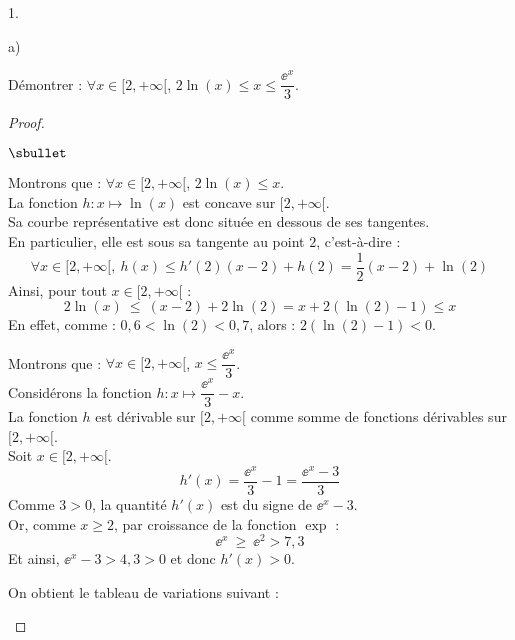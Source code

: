 \documentclass[11pt]{article}%
\begin{document}
\begin{noliste}{1.}
\item 
  \begin{noliste}{a)}
  \item Démontrer : $\forall x\in[2,+\infty[$, $2\ln(x)\leq x \leq
    \dfrac{\ee^x}{3}$.
    
    \begin{proof}~
      \begin{noliste}{$\sbullet$}
      \item Montrons que : $\forall x \in[2,+\infty[$, $2\ln(x)\leq x$.\\
        La fonction $h:x\mapsto \ln(x)$ est concave sur
        $[2,+\infty[$.\\
        Sa courbe représentative est donc située en dessous de ses
        tangentes.\\
        En particulier, elle est sous sa tangente au point $2$,
        c'est-à-dire :
        \[
        \forall x \in [2,+\infty[, \ h(x) \leq h'(2)(x-2) + h(2) =
        \dfrac{1}{2}(x-2) + \ln(2)
        \]
        Ainsi, pour tout $x\in[2,+\infty[$ :
        \[
        2 \ln(x) \ \leq \ (x-2) + 2\ln(2) = x + 2(\ln(2)-1) \leq x
        \]
        En effet, comme : $0,6<\ln(2)<0,7$, alors : $2(\ln(2)-1)<0$. %
        \conc{$\forall x \in [2,+\infty[$, $2\ln(x)\leq x$}
        
      \item Montrons que : $\forall x \in[2,+\infty[$, $x\leq
        \dfrac{\ee^x}{3}$.\\[.2cm]
        Considérons la fonction $h : x \mapsto \dfrac{\ee^x}{3} - x$.\\
        La fonction $h$ est dérivable sur $[2,+\infty[$ comme somme de
        fonctions dérivables sur $[2,+\infty[$.\\
        Soit $x\in[2,+\infty[$.
        \[
        h'(x)=\dfrac{\ee^x}{3}-1 = \dfrac{\ee^x-3}{3}
        \]
        Comme $3>0$, la quantité $h'(x)$ est du signe de $\ee^x-3$.\\
        Or, comme $x \geq 2$, par croissance de la fonction $\exp$ :
        \[
        \ee^x \ \geq \ \ee^2 > 7,3
        \]
        Et ainsi, $\ee^x - 3 > 4,3 > 0$ et donc $h'(x) > 0$.




        \noindent
        On obtient le tableau de variations suivant :        

        \begin{center}
        \end{center}
        

\end{noliste}
\end{proof}
\end{noliste}
\end{noliste}
\end{document}
